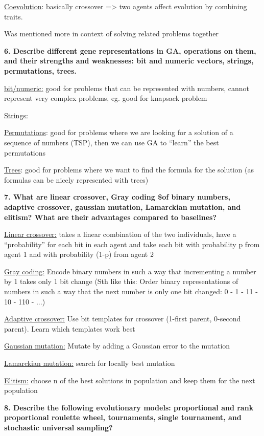 \underline{Coevolution}: basically crossover =\textgreater{} two agents
affect evolution by combining traits.

Was mentioned more in context of solving related problems together

\textbf{6. Describe different gene representations in GA, operations on
them, and their strengths and weaknesses: bit and numeric vectors,
strings, permutations, trees.}

\underline{bit/numeric:} good for problems that can be represented with
numbers, cannot represent very complex problems, eg. good for knapsack
problem

\underline{Strings:}

\underline{Permutations}: good for problems where we are looking for a
solution of a sequence of numbers (TSP), then we can use GA to ``learn''
the best permutations

\underline{Trees}: good for problems where we want to find the formula
for the solution (as formulas can be nicely represented with trees)

\textbf{7. What are linear crossover, Gray coding \$of binary numbers,
adaptive crossover, gaussian mutation, Lamarckian mutation, and elitism?
What are their advantages compared to baselines?}

\underline{Linear crossover:} takes a linear combination of the two
individuals, have a ``probability'' for each bit in each agent and take
each bit with probability p from agent 1 and with probability (1-p) from
agent 2

\underline{Gray coding:} Encode binary numbers in such a way that
incrementing a number by 1 takes only 1 bit change (Sth like this: Order
binary representations of numbers in such a way that the next number is
only one bit changed: 0 - 1 - 11 - 10 - 110 - ...)

\underline{Adaptive crossover:} Use bit templates for crossover (1-first
parent, 0-second parent). Learn which templates work best

\underline{Gaussian mutation:} Mutate by adding a Gaussian error to the
mutation

\underline{Lamarckian mutation:} search for locally best mutation

\underline{Elitism:} choose n of the best solutions in population and
keep them for the next population

\textbf{8. Describe the following evolutionary models: proportional and
rank proportional roulette wheel, tournaments, single tournament, and
stochastic universal sampling?}

